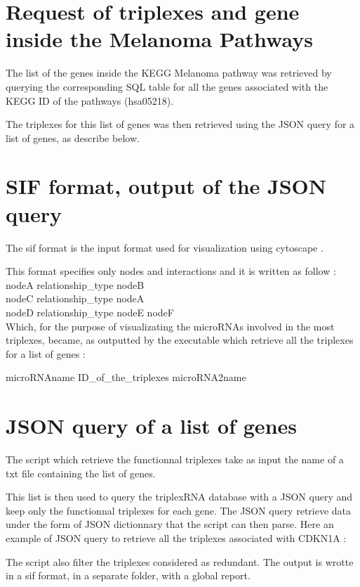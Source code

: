 \documentclass[a4paper,12pt]{report}
\begin{document}
\section{Request of triplexes and gene inside the Melanoma Pathways}

The list of the genes inside the KEGG Melanoma pathway\cite{KEGG} was retrieved by querying the corresponding SQL table for all the genes associated with the KEGG ID of the pathways (hsa05218).

The triplexes for this list of genes was then retrieved using the JSON query for a list of genes, as describe below.

\section{SIF format, output of the JSON query}

The sif format is the input format used for visualization using cytoscape \cite{cytoscape}. 

This format specifies only nodes and interactions and it is written as follow :
\\

nodeA relationship\_type nodeB \\
nodeC relationship\_type nodeA \\
nodeD relationship\_type nodeE nodeF \\
Which, for the purpose of visualizating the microRNAs involved in the most triplexes, became, as outputted by the executable which retrieve all the triplexes for a list of genes :

microRNAname ID\_of\_the\_triplexes microRNA2name

\section{JSON query of a list of genes}

The script which retrieve the functionnal triplexes take as input the name of a txt file containing the list of genes.

This list is then used to query the triplexRNA database with a JSON query and keep only the functionnal triplexes for each gene. The JSON query retrieve data under the form of JSON dictionnary that the script can then parse. Here an example of JSON query to retrieve all the triplexes associated with CDKN1A :



The script also filter the triplexes considered as redundant. The output is wrotte in a sif format, in a separate folder, with a global report.
\end{document}

